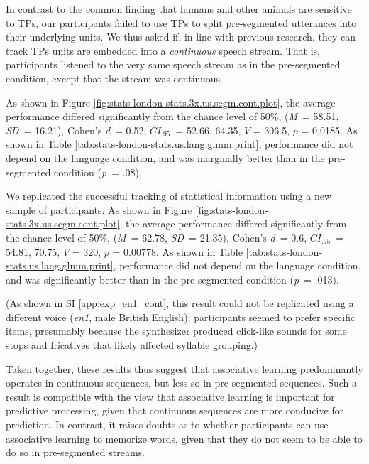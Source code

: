 \documentclass[]{article}
\newcommand{\p}{{\em p\/}}
\newcommand{\M}{{\em M\/}}
\newcommand{\SD}{{\em SD\/}}
\newcommand{\D}{Cohen's {\em d\/}}
\newcommand{\CI}{$CI_{.95}$}
\begin{document}

In contrast to the common finding that humans and other animals are sensitive to TPs, our participants failed to use TPs to split pre-segmented utterances into their underlying units. We thus asked if, in line with previous research, they can track TPs units are embedded into a \emph{continuous} speech stream. That is, participants listened to the very same speech stream as in the pre-segmented condition, except that the stream was continuous.

As shown in Figure \ref{fig:stats-london-stats.3x.us.segm.cont.plot}, the average performance differed significantly from the chance level of 50\%, (\M~= 58.51, \SD~= 16.21), \D~= 0.52, \CI~= 52.66, 64.35, \(V\) = 306.5, \(p\) = 0.0185. As shown in Table \ref{tab:stats-london-stats.us.lang.glmm.print}, performance did not depend on the language condition, and was marginally better than in the pre-segmented condition (\p~= .08).


We replicated the successful tracking of statistical information using a new sample of participants. As shown in Figure \ref{fig:stats-london-stats.3x.us.segm.cont.plot}, the average performance differed significantly from the chance level of 50\%, (\M~= 62.78, \SD~= 21.35), \D~= 0.6, \CI~= 54.81, 70.75, \(V\) = 320, \(p\) = 0.00778. As shown in Table \ref{tab:stats-london-stats.us.lang.glmm.print}, performance did not depend on the language condition, and was significantly better than in the pre-segmented condition (\p~= .013).

(As shown in SI \ref{app:exp_en1_cont}, this result could not be replicated using a different voice (\emph{en1}, male British English); participants seemed to prefer specific items, presumably because the synthesizer produced click-like sounds for some stops and fricatives that likely affected syllable grouping.)

Taken together, these results thus suggest that associative learning predominantly operates in continuous sequences, but less so in pre-segmented sequences. Such a result is compatible with the view that associative learning is important for predictive processing, given that continuous sequences are more conducive for prediction. In contrast, it raises doubts as to whether participants can use associative learning to memorize words, given that they do not seem to be able to do so in pre-segmented streams.
\end{document}

